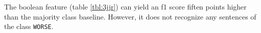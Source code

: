 %  


The boolean feature (table \ref{tbl:3jjr}) can yield an f1 score fiften points higher than the majority class baseline. However, it does not recognize any sentences of the class \texttt{WORSE}.

